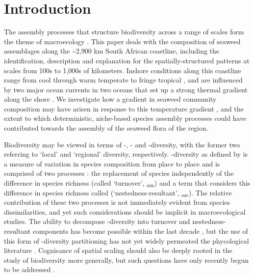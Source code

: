 \documentclass[utf8]{frontiersSCNS} %
\begin{document}
\section{Introduction}

The assembly processes that structure biodiversity across a range of scales form the theme of macroecology \citep{Chave2013}. This paper deals with the composition of seaweed assemblages along the \textasciitilde{}2,900 km South African coastline, including the identification, description and explanation for the spatially-structured patterns at scales from 100s to 1,000s of kilometers. Inshore conditions along this coastline range from cool through warm temperate to fringe tropical \citep{Bolton2004, BoltonAnderson2004}, and are influenced by two major ocean currents in two oceans that set up a strong thermal gradient along the shore \citep{Smit2013}. We investigate how a gradient in seaweed community composition may have arisen in response to this temperature gradient \citep[\emph{e.g.}][]{Qian2007}, and the extent to which deterministic, niche-based species assembly processes could have contributed towards the assembly of the seaweed flora of the region.

Biodiversity may be viewed in terms of \textalpha-, \textgamma- and \textbeta-diversity, with the former two referring to `local' and `regional' diversity, respectively. \textbeta-diversity as defined by \citet{Whittaker1960,Whittaker1972} is a measure of variation in species composition from place to place and is comprised of two processes \citep{Baselga2012}: the replacement of species independently of the difference in species richness (called `turnover', \textbeta$_{\text{sim}}$) and a term that considers this difference in species richness called (`nestedness-resultant', \textbeta$_{\text{sne}}$). The relative contribution of these two processes is not immediately evident from species dissimilarities, and yet such considerations should be implicit in macroecological studies. The ability to decompose \textbeta-diversity into turnover and nestedness-resultant components has become possible within the last decade \citep{Baselga2010}, but the use of this form of \textbeta-diversity partitioning has not yet widely permeated the phycological literature \citep[or even in marine studies more broadly;][]{Anderson2013}. Cognisance of spatial scaling should also be deeply rooted in the study of biodiversity more generally, but such questions have only recently begun to be addressed \citep{Barton2013}.
\end{document}
